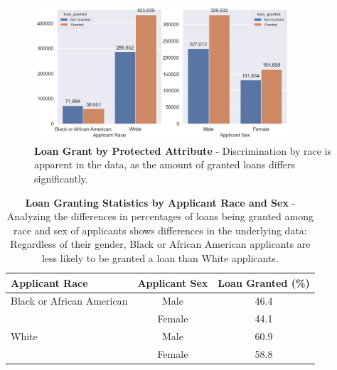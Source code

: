 \begin{figure}[!htbp]
    \centering
    \includegraphics[width=0.85\textwidth]{images/CHXX_Loan_Grant_By_Protected_Attribute.png}
    \caption[Loan Grant by Protected Attribute]{\textbf{Loan Grant by Protected Attribute} - Discrimination by race is apparent in the data, as the amount of granted loans differs significantly.}
    \label{fig:CHXX_Loan_Grant_By_Protected_Attribute}
\end{figure}

\begin{table}[!htbp]
    \centering
      \begin{tabular}{lcc}
      \toprule
      \textbf{Applicant Race} & \textbf{Applicant Sex} & \textbf{Loan Granted (\%)} \\
      \midrule
      Black or African American & Male    & 46.4 \\
            & Female  & 44.1 \\
      White & Male    & 60.9 \\
            & Female  & 58.8 \\
      \bottomrule
      \end{tabular}
    \medskip
    \caption[Loan Granting Statistics by Applicant Race and Sex]{\textbf{Loan Granting Statistics by Applicant Race and Sex} - Analyzing the differences in percentages of loans being granted among race and sex of applicants shows differences in the underlying data: Regardless of their gender, Black or African American applicants are less likely to be granted a loan than White applicants.}
    \label{tab:loan_granting}%
\end{table}%

